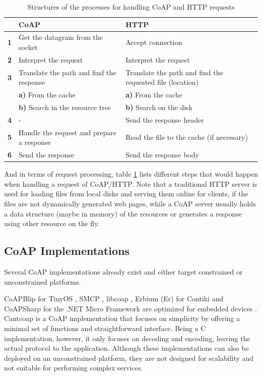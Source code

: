 \begin{table}[!htbp]
\centering
\begin{tabular}{lll}
%
 & \bfseries CoAP &  \bfseries HTTP \\ \hline
\bfseries 1 & Get the datagram from the socket & Accept connection \\
\bfseries 2 & Interpret the request & Interpret the request \\
\bfseries 3 & Translate the path and find the response & Translate the path and find the requested file (location) \\
%
& \textbf{a)} From the cache & \textbf{a)} From the cache \\
%
& \textbf{b)} Search in the resource tree & \textbf{b)} Search on the disk \\
\bfseries 4 & - & Send the response header \\
\bfseries 5 & Handle the request and prepare a response & Read the file to the cache (if necessary) \\
\bfseries 6 & Send the response & Send the response body \\
\end{tabular}
\caption{Structures of the processes for handling CoAP and HTTP requests}
\label{tab:coap_vs_http}
\end{table}

And in terms of request processing, table \ref{tab:coap_vs_http} \cite{lanter2013scalability} lists different steps that would happen when handling a request of CoAP/HTTP. Note that a traditional HTTP server is used for loading files from local disks and serving them online for clients, if the files are not dynamically generated web pages, while a CoAP server usually holds a data structure (maybe in memory) of the resources or generates a response using other resource on the fly.  

\subsection{CoAP Implementations}\label{CoAP_imp}

Several CoAP implementations already exist and either target constrained or unconstrained platforms. 

CoAPBlip for TinyOS \cite{6208761}, SMCP \cite{SMCP}, libcoap \cite{kuladinithi2011implementation}, Erbium (Er) for Contiki \cite{kovatsch2011low} and CoAPSharp \cite{coapsharp} for the .NET Micro Framework are optimized for embedded devices \cite{lanter2013scalability}. Cantcoap \cite{cantcoap} is a CoAP implementation that focuses on simplicity by offering a minimal set of functions and straightforward interface. Being a C implementation, however, it only focuses on decoding and encoding, leaving the actual protocol to the application. Although these implementations can also be deployed on an unconstrained platform, they are not designed for scalability and not suitable for performing complex services.

